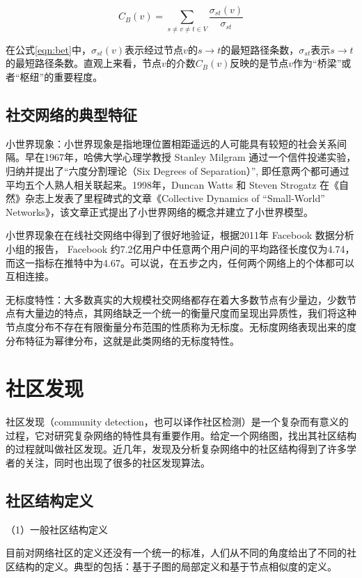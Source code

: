 \begin{equation}
  \label{eqn:bet}
  C_B(v)=\sum _{s\neq v\neq t \in V}\frac{\sigma_{st}(v)}{\sigma_{st}}
\end{equation}

在公式\ref{eqn:bet}中，$\sigma_{st}(v)$表示经过节点$v$的$s\rightarrow t$的最短路径条数，$\sigma_{st}$表示$s\rightarrow t$的最短路径条数。直观上来看，节点$v$的介数$C_B(v)$反映的是节点$v$作为“桥梁”或者“枢纽”的重要程度。

\subsection{社交网络的典型特征}

小世界现象：小世界现象是指地理位置相距遥远的人可能具有较短的社会关系间隔。早在1967年，哈佛大学心理学教授 Stanley Milgram 通过一个信件投递实验，归纳并提出了“六度分割理论（Six Degrees of Separation）”,  即任意两个都可通过平均五个人熟人相关联起来。1998年，Duncan Watts 和 Steven Strogatz 在《自然》杂志上发表了里程碑式的文章《Collective Dynamics of “Small-World” Networks》，该文章正式提出了小世界网络的概念并建立了小世界模型。

小世界现象在在线社交网络中得到了很好地验证，根据2011年 Facebook 数据分析小组的报告， Facebook 约7.2亿用户中任意两个用户间的平均路径长度仅为4.74，而这一指标在推特中为4.67。可以说，在五步之内，任何两个网络上的个体都可以互相连接。

无标度特性：大多数真实的大规模社交网络都存在着大多数节点有少量边，少数节点有大量边的特点，其网络缺乏一个统一的衡量尺度而呈现出异质性，我们将这种节点度分布不存在有限衡量分布范围的性质称为无标度。无标度网络表现出来的度分布特征为幂律分布，这就是此类网络的无标度特性。

\section{社区发现}

社区发现（community detection，也可以译作社区检测）是一个复杂而有意义的过程，它对研究复杂网络的特性具有重要作用。给定一个网络图，找出其社区结构的过程就叫做社区发现。近几年，发现及分析复杂网络中的社区结构得到了许多学者的关注，同时也出现了很多的社区发现算法。

\subsection{社区结构定义}

（1）一般社区结构定义

目前对网络社区的定义还没有一个统一的标准，人们从不同的角度给出了不同的社区结构的定义。典型的包括：基于子图的局部定义和基于节点相似度的定义。

